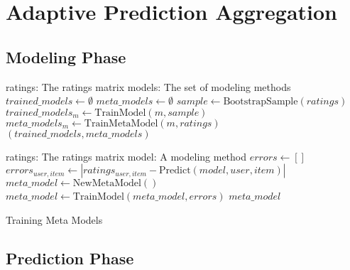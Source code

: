 \section{Adaptive Prediction Aggregation}

\subsection{Modeling Phase}

\begin{algorithm}
  \begin{algorithmic}[1]
  \REQUIRE ratings: The ratings matrix
  \REQUIRE models: The set of modeling methods
  \ENSURE
    \STATE $trained\_models \gets \emptyset$
    \STATE $meta\_models \gets \emptyset$
      \STATE $sample \gets \mathrm{BootstrapSample}(ratings)$
      \STATE $trained\_models_m \gets \mathrm{TrainModel}(m, sample)$
      \STATE $meta\_models_m \gets \mathrm{TrainMetaModel}(m, ratings)$
    \ENDFOR 
  \RETURN $(trained\_models, meta\_models)$
  \end{algorithmic}
  \caption[Training]{Training
  }
  \label{code:training}
\end{algorithm}



\begin{algorithm}
  \begin{algorithmic}[1]
  \REQUIRE ratings: The ratings matrix
  \REQUIRE model: A modeling method
  \ENSURE
    \STATE $errors \gets []$
        \STATE $errors_{user,item} \gets | ratings_{user,item} - \mathrm{Predict}(model, user, item) |$
    \ENDFOR 
    \STATE $meta\_model \gets \mathrm{NewMetaModel}()$
    \STATE $meta\_model \gets \mathrm{TrainModel}(meta\_model, errors)$
  \RETURN $meta\_model$
  \end{algorithmic}
  \caption[Training Meta Models]{Training Meta Models}
  \label{code:trainmetamodel}
\end{algorithm}







\subsection{Prediction Phase}

